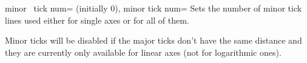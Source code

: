 \begin{pgfplotsxykeylist}{%
    minor \x\ tick num= (initially 0),
    minor tick num=%
}
    Sets the number of minor tick lines used either for single axes or for all
    of them.

    Minor ticks will be disabled if the major ticks don't have the same
    distance and they are currently only available for linear axes (not for
    logarithmic ones).
\begin{codeexample}[]
\end{codeexample}

\begin{codeexample}[]
\end{codeexample}

\begin{codeexample}[]
\end{codeexample}
\end{pgfplotsxykeylist}

